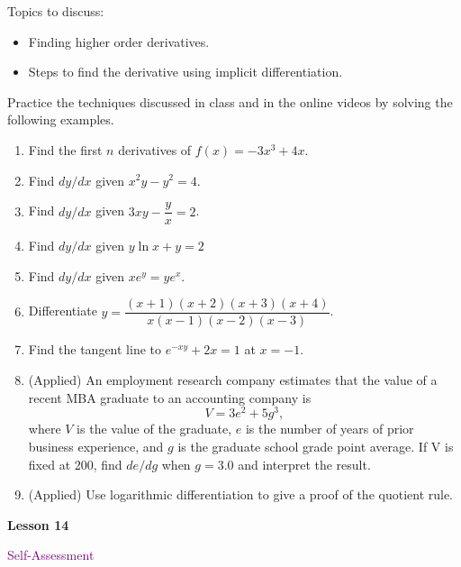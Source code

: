 \documentclass[10pt]{book}
\theoremstyle{definition}
\theoremstyle{remark}
\begin{document}
\begin{large}
\noindent
Topics to discuss:
\begin{itemize}
\item Finding higher order derivatives. 
\item Steps to find the derivative using implicit differentiation. 
\end{itemize}
\newpage

\noindent
Practice the techniques discussed in class and in the online videos by solving the following examples. 
\begin{enumerate}
\item Find the first $n$ derivatives of $f(x) = -3x^3+4x$.\vfil\vfil
\item Find $dy/dx$ given $x^2y - y^2 = 4$.\vfil\vfil
\item Find $dy/dx$ given $ 3xy - \dfrac{y}{x} = 2$.\vfil
\newpage

\item Find $dy/dx$ given $ y \ln x + y = 2$\vfil\vfil
\item Find $dy/dx$ given $ xe^y = ye^x$.\vfil\vfil
\item Differentiate $y = \dfrac{(x+1)(x+2)(x+3)(x+4)}{x(x-1)(x-2)(x-3)}$.\vfil
\newpage

\item Find the tangent line to $e^{-xy} + 2x = 1$ at $x=-1$.\vfil\vfil
\item (Applied) An employment research company estimates that the value of a recent MBA graduate to an accounting company is \[V = 3e^2 + 5g^3,\] where $V$ is the value of the graduate, $e$ is the number of years of prior business experience, and $g$ is the graduate school grade point average. If V is fixed at 200, find $de/dg$ when $g = 3.0$ and interpret the result.\vfil\vfil
\item (Applied) Use logarithmic differentiation to give a proof of the quotient rule.\vfil
\end{enumerate}
\end{large}
\newpage


\begin{tcolorbox}[
  width=\textwidth,
  colback=gray!10, %
  colframe=white, %
  boxrule=0pt,    %
  left=1cm,       %
  right=1cm,      %
  sharp corners  %
]

\begin{minipage}[t]{0.5\textwidth}
  \Huge \textbf{Lesson 14}
\end{minipage}%
\hfill
\begin{minipage}[t]{0.5\textwidth}
  \Huge\textcolor{purple}{Self-Assessment}
\end{minipage}
\end{tcolorbox}
\end{document}
